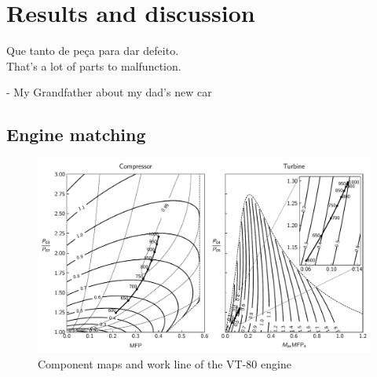 \documentclass[tcc]{subfiles}
\begin{document}
\chapter{Results and discussion}
\label{sec:results}
\epigraph{Que tanto de peça para dar defeito.\\{\footnotesize That's a lot of parts to malfunction.}}{- My Grandfather about my dad's new car}

\section{Engine matching}
\begin{figure}
    \AddThispageHook{\thispagestyle{empty}}
    \caption{Component maps and work line of the VT-80 engine}
\includegraphics{fig/wline.pdf}
\end{figure}
\end{document}
